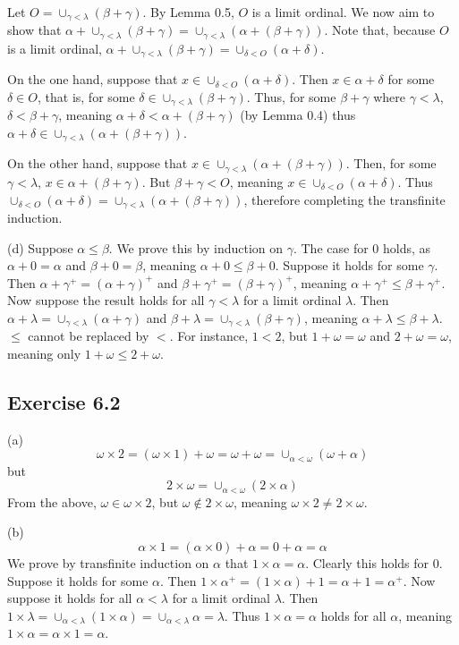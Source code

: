 \documentclass{article}
\theoremstyle{definition}
\begin{document}
Let $O=\cup_{\gamma<\lambda}(\beta+\gamma)$. By Lemma 0.5, $O$ is a limit ordinal. We now aim to show that 
$\alpha+\cup_{\gamma<\lambda}(\beta+\gamma)=\cup_{\gamma<\lambda}(\alpha+(\beta+\gamma))$. Note that, because $O$ is a limit ordinal, 
$\alpha+\cup_{\gamma<\lambda}(\beta+\gamma)=\cup_{\delta<O}(\alpha+\delta)$.

On the one hand, suppose that $x\in\cup_{\delta<O}(\alpha+\delta)$. Then $x\in\alpha+\delta$ for some 
$\delta\in O$, that is, for some $\delta\in\cup_{\gamma<\lambda}(\beta+\gamma)$. Thus, for some 
$\beta+\gamma$ where $\gamma<\lambda$, $\delta<\beta+\gamma$, meaning $\alpha+\delta<\alpha+(\beta+\gamma)$ 
(by Lemma 0.4) 
thus $\alpha+\delta\in\cup_{\gamma<\lambda}(\alpha+(\beta+\gamma))$.

On the other hand, suppose that $x\in\cup_{\gamma<\lambda}(\alpha+(\beta+\gamma))$. Then, for some 
$\gamma<\lambda$, $x\in\alpha+(\beta+\gamma)$. But $\beta+\gamma<O$, meaning $x\in\cup_{\delta<O}(\alpha+\delta)$.
Thus $\cup_{\delta<O}(\alpha+\delta)=\cup_{\gamma<\lambda}(\alpha+(\beta+\gamma))$, therefore completing the transfinite 
induction.

(d) Suppose $\alpha\le\beta$. We prove this by induction on $\gamma$. The case for $0$ holds, as $\alpha+0=\alpha$ and $\beta+0=\beta$, meaning 
$\alpha+0\le\beta+0$. Suppose it holds for some $\gamma$. Then $\alpha+\gamma^+=(\alpha+\gamma)^+$ and 
$\beta+\gamma^+=(\beta+\gamma)^+$, meaning $\alpha+\gamma^+\le\beta+\gamma^+$. Now suppose the result holds for all $\gamma<\lambda$ for a 
limit ordinal $\lambda$. Then $\alpha+\lambda=\cup_{\gamma<\lambda}(\alpha+\gamma)$ and 
$\beta+\lambda=\cup_{\gamma<\lambda}(\beta+\gamma)$, meaning $\alpha+\lambda\le\beta+\lambda$. $\le$ cannot be replaced by $<$. For instance, 
$1<2$, but $1+\omega=\omega$ and $2+\omega=\omega$, meaning only $1+\omega\le 2+\omega$.

\subsection*{Exercise 6.2}
(a) \[ \omega\times 2=(\omega\times 1)+\omega=\omega+\omega=\cup_{\alpha<\omega}(\omega+\alpha) \] but
\[ 2\times\omega=\cup_{\alpha<\omega}(2\times\alpha) \] From the above, $\omega\in\omega\times 2$, but 
$\omega\notin 2\times\omega$, meaning $\omega\times 2\ne 2\times\omega$.

(b) \[ \alpha\times 1=(\alpha\times 0)+\alpha=0+\alpha=\alpha \] We prove by transfinite induction on $\alpha$ 
that $1\times\alpha=\alpha$. Clearly this holds for $0$. Suppose it holds for some $\alpha$. Then 
$1\times\alpha^+=(1\times\alpha)+1=\alpha+1=\alpha^+$. Now suppose it holds for all $\alpha<\lambda$ for a limit ordinal 
$\lambda$. Then $1\times\lambda=\cup_{\alpha<\lambda}(1\times\alpha)=\cup_{\alpha<\lambda}\alpha=\lambda$. Thus 
$1\times\alpha=\alpha$ holds for all $\alpha$, meaning $1\times\alpha=\alpha\times 1=\alpha$.
\end{document}
